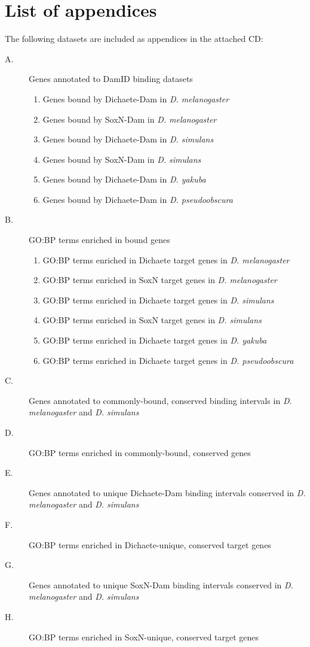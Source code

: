 \chapter*{List of appendices}

The following datasets are included as appendices in the attached CD:

\begin{description}
	\item[A.] Genes annotated to DamID binding datasets
	\begin{enumerate}
		\item Genes bound by Dichaete-Dam in \emph{D. melanogaster}
		\item Genes bound by SoxN-Dam in \emph{D. melanogaster}
		\item Genes bound by Dichaete-Dam in \emph{D. simulans}
		\item Genes bound by SoxN-Dam in \emph{D. simulans}
		\item Genes bound by Dichaete-Dam in \emph{D. yakuba}
		\item Genes bound by Dichaete-Dam in \emph{D. pseudoobscura}
	\end{enumerate}
	\item[B.] GO:BP terms enriched in bound genes
	\begin{enumerate}
		\item GO:BP terms enriched in Dichaete target genes in \emph{D. melanogaster}
		\item GO:BP terms enriched in SoxN target genes in \emph{D. melanogaster}
		\item GO:BP terms enriched in Dichaete target genes in \emph{D. simulans}
		\item GO:BP terms enriched in SoxN target genes in \emph{D. simulans}
		\item GO:BP terms enriched in Dichaete target genes in \emph{D. yakuba}
		\item GO:BP terms enriched in Dichaete target genes in \emph{D. pseudoobscura}
	\end{enumerate}
	\item[C.] Genes annotated to commonly-bound, conserved binding intervals in \emph{D.\\
	 melanogaster} and \emph{D. simulans}
	\item[D.] GO:BP terms enriched in commonly-bound, conserved genes
	\item[E.] Genes annotated to unique Dichaete-Dam binding intervals conserved in \emph{D. melanogaster} and \emph{D. simulans}
	\item[F.] GO:BP terms enriched in Dichaete-unique, conserved target genes
	\item[G.] Genes annotated to unique SoxN-Dam binding intervals conserved in \emph{D. melanogaster} and \emph{D. simulans}
	\item[H.] GO:BP terms enriched in SoxN-unique, conserved target genes
\end{description}
